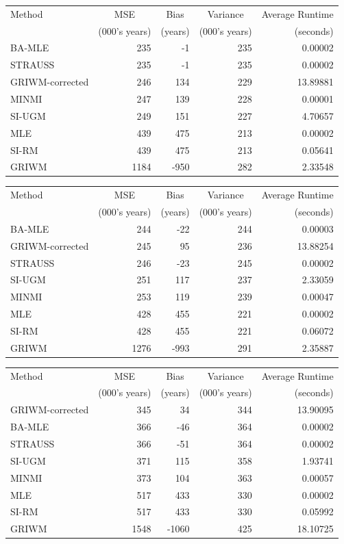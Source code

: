 \documentclass[
]{article}
\begin{document}
\begin{tabular}{lrrrr}
\toprule
\multicolumn{1}{l}{Method} & \multicolumn{1}{c}{MSE} & \multicolumn{1}{c}{Bias} & \multicolumn{1}{c}{Variance} & \multicolumn{1}{c}{Average Runtime} \\
 & (000's years) & (years) & (000's years) & (seconds)\\
\midrule
BA-MLE & 235 & -1 & 235 & 0.00002\\
STRAUSS & 235 & -1 & 235 & 0.00002\\
GRIWM-corrected & 246 & 134 & 229 & 13.89881\\
MINMI & 247 & 139 & 228 & 0.00001\\
SI-UGM & 249 & 151 & 227 & 4.70657\\
\addlinespace
MLE & 439 & 475 & 213 & 0.00002\\
SI-RM & 439 & 475 & 213 & 0.05641\\
GRIWM & 1184 & -950 & 282 & 2.33548\\
\bottomrule
\end{tabular}

\begin{tabular}{lrrrr}
\toprule
\multicolumn{1}{l}{Method} & \multicolumn{1}{c}{MSE} & \multicolumn{1}{c}{Bias} & \multicolumn{1}{c}{Variance} & \multicolumn{1}{c}{Average Runtime} \\
 & (000's years) & (years) & (000's years) & (seconds)\\
\midrule
BA-MLE & 244 & -22 & 244 & 0.00003\\
GRIWM-corrected & 245 & 95 & 236 & 13.88254\\
STRAUSS & 246 & -23 & 245 & 0.00002\\
SI-UGM & 251 & 117 & 237 & 2.33059\\
MINMI & 253 & 119 & 239 & 0.00047\\
\addlinespace
MLE & 428 & 455 & 221 & 0.00002\\
SI-RM & 428 & 455 & 221 & 0.06072\\
GRIWM & 1276 & -993 & 291 & 2.35887\\
\bottomrule
\end{tabular}

\begin{tabular}{lrrrr}
\toprule
\multicolumn{1}{l}{Method} & \multicolumn{1}{c}{MSE} & \multicolumn{1}{c}{Bias} & \multicolumn{1}{c}{Variance} & \multicolumn{1}{c}{Average Runtime} \\
 & (000's years) & (years) & (000's years) & (seconds)\\
\midrule
GRIWM-corrected & 345 & 34 & 344 & 13.90095\\
BA-MLE & 366 & -46 & 364 & 0.00002\\
STRAUSS & 366 & -51 & 364 & 0.00002\\
SI-UGM & 371 & 115 & 358 & 1.93741\\
MINMI & 373 & 104 & 363 & 0.00057\\
\addlinespace
MLE & 517 & 433 & 330 & 0.00002\\
SI-RM & 517 & 433 & 330 & 0.05992\\
GRIWM & 1548 & -1060 & 425 & 18.10725\\
\bottomrule
\end{tabular}
\end{document}
